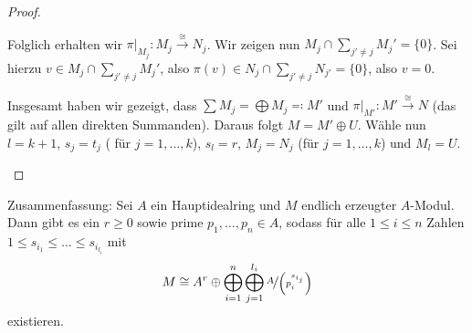 \documentclass[12pt,a4paper]{scrartcl}
\theoremstyle{cplain}
\theoremstyle{cdef}
\begin{document}
\begin{proof}
\begin{description}
		Folglich erhalten wir $\pi|_{M_j}\colon M_j\xrightarrow{\cong} N_j$. Wir zeigen nun $M_j\cap \sum_{j'\neq j} M_j' = \{0\}$. Sei hierzu $v\in M_j\cap\sum_{j'\neq j} M_j'$, also $\pi(v) \in N_j\cap\sum_{j'\neq j} N_{j'} = \{0\}$, also $v = 0$.
		
		Insgesamt haben wir gezeigt, dass $\sum M_j = \bigoplus M_j \eqqcolon M'$ und $\pi|_{M'}\colon M'\xrightarrow{\cong} N$ (das gilt auf allen direkten Summanden). Daraus folgt $M = M'\oplus U$. Wähle nun $l = k+1$, $s_j  = t_j$ ( für $j = 1,\dots, k$), $s_l = r$, $M_j = N_j$ (für $j = 1,\dots, k$) und $M_l = U$.
		\qedhere
	\end{description}
\end{proof}

Zusammenfassung: Sei $A$ ein Hauptidealring und $M$ endlich erzeugter $A$-Modul. Dann gibt es ein $r\ge 0$ sowie prime $p_1,\dots, p_n\in A$, sodass für alle $1 \le i \le n$ Zahlen $1 \le s_{i_1} \le \dots \le s_{i_{l_i}}$ mit
\[M\cong A^r\oplus \bigoplus_{i = 1}^n\bigoplus_{j = 1}^{l_i} \nicefrac{A}{\left(p_i^{s_{i_j}}\right)}\]
existieren.
\end{document}
